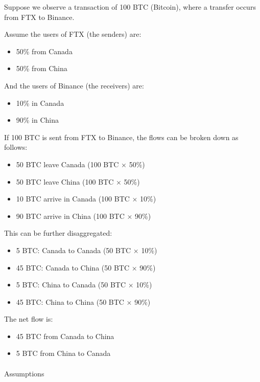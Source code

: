 \documentclass[
  11pt,
]{article}
\makeatletter
\let\oldparagraph\paragraph
\renewcommand{\paragraph}{
    \@ifstar
      \xxxParagraphStar
      \xxxParagraphNoStar
  }
\newcommand{\xxxParagraphStar}[1]{\oldparagraph*{#1}\mbox{}}
\newcommand{\xxxParagraphNoStar}[1]{\oldparagraph{#1}\mbox{}}
\providecommand{\tightlist}{%
  \setlength{\itemsep}{0pt}\setlength{\parskip}{0pt}}\usepackage{longtable,booktabs,array}
\makeatother
\begin{document}
Suppose we observe a transaction of 100 BTC (Bitcoin), where a transfer
occurs from FTX to Binance.

Assume the users of FTX (the senders) are:

\begin{itemize}
\tightlist
\item
  50\% from Canada
\item
  50\% from China
\end{itemize}

And the users of Binance (the receivers) are:

\begin{itemize}
\tightlist
\item
  10\% in Canada
\item
  90\% in China
\end{itemize}

If 100 BTC is sent from FTX to Binance, the flows can be broken down as
follows:

\begin{itemize}
\tightlist
\item
  50 BTC leave Canada (100 BTC × 50\%)
\item
  50 BTC leave China (100 BTC × 50\%)
\item
  10 BTC arrive in Canada (100 BTC × 10\%)
\item
  90 BTC arrive in China (100 BTC × 90\%)
\end{itemize}

This can be further disaggregated:

\begin{itemize}
\tightlist
\item
  5 BTC: Canada to Canada (50 BTC × 10\%)
\item
  45 BTC: Canada to China (50 BTC × 90\%)
\item
  5 BTC: China to Canada (50 BTC × 10\%)
\item
  45 BTC: China to China (50 BTC × 90\%)
\end{itemize}

The net flow is:

\begin{itemize}
\tightlist
\item
  45 BTC from Canada to China
\item
  5 BTC from China to Canada
\end{itemize}

\paragraph{Assumptions}\label{assumptions}
\end{document}
